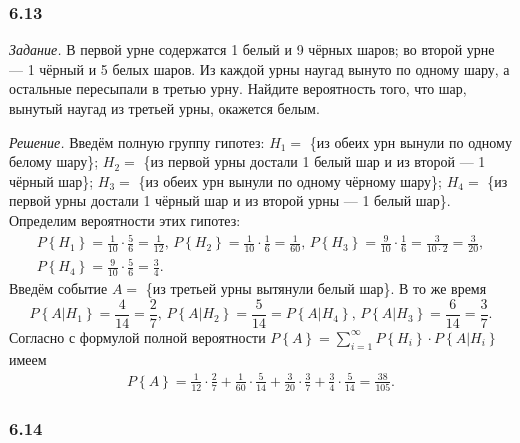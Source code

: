 \subsubsection*{6.13}

\textit{Задание.} В первой урне содержатся 1 белый и 9 чёрных шаров; во второй урне --- 1 чёрный и 5 белых шаров.
Из каждой урны наугад вынуто по одному шару, а остальные пересыпали в третью урну.
Найдите вероятность того, что шар, вынутый наугад из третьей урны, окажется белым.

\textit{Решение.}
Введём полную группу гипотез:
$H_1 =$ \{из обеих урн вынули по одному белому шару\};
$H_2 =$ \{из первой урны достали 1 белый шар и из второй --- 1 чёрный шар\};
$H_3 =$ \{из обеих урн вынули по одному чёрному шару\};
$H_4 =$ \{из первой урны достали 1 чёрный шар и из второй урны --- 1 белый шар\}.
Определим вероятности этих гипотез:
\begin{equation*}
\begin{split}
P \left\{ H_1 \right\} =
\frac{1}{10} \cdot \frac{5}{6} =
\frac{1}{12}, \,
P \left\{ H_2 \right\} =
\frac{1}{10} \cdot \frac{1}{6} =
\frac{1}{60}, \,
P \left\{ H_3 \right\} =
\frac{9}{10} \cdot \frac{1}{6} =
\frac{3}{10 \cdot 2} =
\frac{3}{20}, \\
P \left\{ H_4 \right\} =
\frac{9}{10} \cdot \frac{5}{6} =
\frac{3}{4}.
\end{split}
\end{equation*}
Введём событие $A =$ \{из третьей урны вытянули белый шар\}.
В то же время
$$P \left\{ \left. A \right| H_1 \right\} =
\frac{4}{14} =
\frac{2}{7}, \,
P \left\{ \left. A \right| H_2 \right\} =
\frac{5}{14} =
P \left\{ \left. A \right| H_4 \right\}, \,
P \left\{ \left. A \right| H_3 \right\} =
\frac{6}{14} =
\frac{3}{7}.$$
Согласно с формулой полной вероятности $P \left\{ A \right\} = \sum \limits_{i=1}^\infty P \left\{ H_i \right\} \cdot P \left\{ \left. A \right| H_i \right\} $ имеем
\begin{equation*}
\begin{split}
P \left\{ A \right\} =
\frac{1}{12} \cdot \frac{2}{7} + \frac{1}{60} \cdot \frac{5}{14} + \frac{3}{20} \cdot \frac{3}{7} + \frac{3}{4} \cdot \frac{5}{14} =
\frac{38}{105}.
\end{split}
\end{equation*}

\subsubsection*{6.14}


